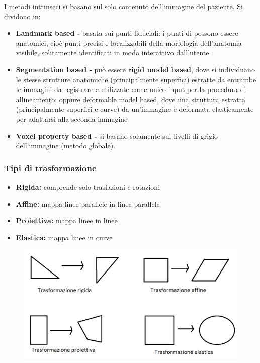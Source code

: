 I metodi intrinseci si basano sul solo contenuto dell'immagine del paziente. Si dividono in:

\begin{itemize}
    \item \textbf{Landmark based -} basata sui punti fiduciali: i punti di possono essere anatomici, cioè punti precisi e
          localizzabili della morfologia dell'anatomia visibile, solitamente identificati in modo interattivo dall'utente.
    \item \textbf{Segmentation based -} può essere \textbf{rigid model based}, dove si
          individuano le stesse strutture anatomiche (principalmente superfici) estratte da entrambe le immagini da registrare e
          utilizzate come unico input per la procedura di allineamento; oppure deformable model based, dove una struttura estratta
          (principalmente superfici e curve) da un'immagine è deformata elasticamente per adattarsi alla seconda immagine
    \item  \textbf{Voxel property based -} si basano solamente sui livelli di grigio
          dell'immagine (metodo globale).
\end{itemize}

\newpage
\subsubsection{Tipi di trasformazione}

\begin{itemize}
    \item \textbf{Rigida:} comprende solo traslazioni e rotazioni
    \item \textbf{Affine:} mappa linee parallele in linee parallele
    \item \textbf{Proiettiva:} mappa linee in linee
    \item \textbf{Elastica:} mappa linee in curve
\end{itemize}

\begin{figure}[H]
    \centering
    \includegraphics[width=\linewidth, keepaspectratio]{capitoli/immagini/imgs/tipi-trasformazione.png}
\end{figure}

